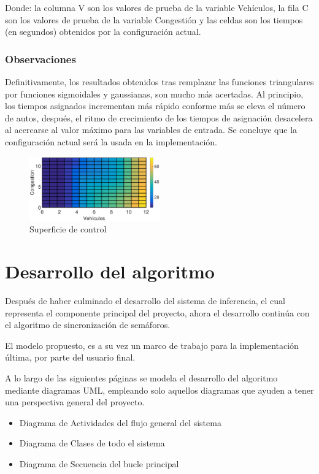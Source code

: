 Donde: la columna V son los valores de prueba de la variable Vehículos, la fila C son los valores de  prueba de la variable Congestión y las celdas son los tiempos (en segundos) obtenidos por la configuración actual.

\subsubsection{Observaciones}

\begin{multicols}{2}
	Definitivamente, los resultados obtenidos tras remplazar las funciones triangulares por funciones sigmoidales y gaussianas, son mucho más acertadas. Al principio, los tiempos asignados incrementan más rápido conforme más se eleva el número de autos, después, el ritmo de crecimiento de los tiempos de asignación desacelera al acercarse al valor máximo para las variables de entrada. Se concluye que la configuración actual será la usada en la implementación.
	\begin{figure}[H]
	\includegraphics[width=0.5\textwidth]{Surfaces/Surface2D_D.eps}
	\caption{Superficie de control}
\end{figure}
\end{multicols}
\pagebreak

\section{Desarrollo del algoritmo}\label{section:desarrolloAlgoritmo}
Después de haber culminado el desarrollo del sistema de inferencia, el cual representa el componente principal del proyecto, ahora el desarrollo continúa con el algoritmo de sincronización de semáforos.

El modelo propuesto, es a su vez un marco de trabajo para la implementación última, por parte del usuario final.

A lo largo de las siguientes páginas se modela el desarrollo del algoritmo mediante diagramas UML, empleando solo aquellos diagramas que ayuden a tener una perspectiva general del proyecto.
\begin{itemize}
	\item Diagrama de Actividades del flujo general del sistema
	\item Diagrama de Clases de todo el sistema
	\item Diagrama de Secuencia del bucle principal
\end{itemize}

